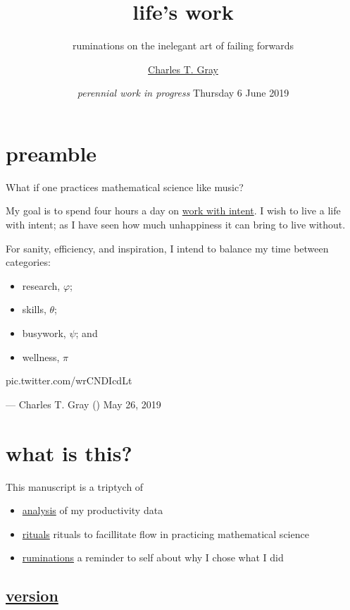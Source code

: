 \documentclass[]{book}
\title{life's work}
\subtitle{ruminations on the inelegant art of failing forwards}
\author{\href{http://cantabile.rbind.io/about.html}{Charles T. Gray}}
\date{\emph{perennial work in progress} Thursday 6 June 2019}
\providecommand{\tightlist}{%
  \setlength{\itemsep}{0pt}\setlength{\parskip}{0pt}}
\begin{document}
\maketitle

{
\setcounter{tocdepth}{1}
\tableofcontents
}
\hypertarget{preamble}{%
\chapter{preamble}\label{preamble}}

What if one practices mathematical science like music?

My goal is to spend four hours a day on \protect\hyperlink{work-with-intent}{work with intent}. I wish to live a life with intent; as I have seen how much unhappiness it can bring to live without.

For sanity, efficiency, and inspiration, I intend to balance my time between categories:

\begin{itemize}
\tightlist
\item
  research, \(\varphi\);
\item
  skills, \(\theta\);\\
\item
  busywork, \(\psi\); and
\item
  wellness, \(\pi\)
\end{itemize}

pic.twitter.com/wrCNDIcdLt

--- Charles T. Gray (\citet{cantabile}) May 26, 2019

\hypertarget{what-is-this}{%
\chapter{what is this?}\label{what-is-this}}

This manuscript is a triptych of

\begin{itemize}
\tightlist
\item
  \protect\hyperlink{analysis}{analysis} of my productivity data
\item
  \protect\hyperlink{rituals}{rituals} rituals to facillitate flow in practicing mathematical science
\item
  \protect\hyperlink{ruminations}{ruminations} a reminder to self about why I chose what I did
\end{itemize}

\hypertarget{version}{%
\section{\texorpdfstring{\protect\hyperlink{mindfulness}{version}}{version}}\label{version}}
\end{document}
